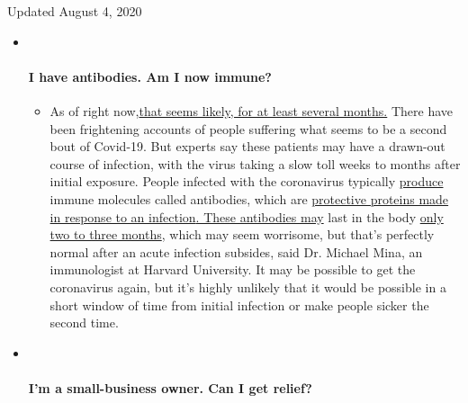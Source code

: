 Updated August 4, 2020

\begin{itemize}
\item ~
  \hypertarget{i-have-antibodies-am-i-now-immune}{%
  \paragraph{I have antibodies. Am I now
  immune?}\label{i-have-antibodies-am-i-now-immune}}

  \begin{itemize}
  \tightlist
  \item
    As of right
    now,\href{https://www.nytimes.com/2020/07/22/health/covid-antibodies-herd-immunity.html?action=click\&pgtype=Article\&state=default\&region=MAIN_CONTENT_3\&context=storylines_faq}{that
    seems likely, for at least several months.} There have been
    frightening accounts of people suffering what seems to be a second
    bout of Covid-19. But experts say these patients may have a
    drawn-out course of infection, with the virus taking a slow toll
    weeks to months after initial exposure. People infected with the
    coronavirus typically
    \href{https://www.nature.com/articles/s41586-020-2456-9}{produce}
    immune molecules called antibodies, which are
    \href{https://www.nytimes.com/2020/05/07/health/coronavirus-antibody-prevalence.html?action=click\&pgtype=Article\&state=default\&region=MAIN_CONTENT_3\&context=storylines_faq}{protective
    proteins made in response to an
    infection}\href{https://www.nytimes.com/2020/05/07/health/coronavirus-antibody-prevalence.html?action=click\&pgtype=Article\&state=default\&region=MAIN_CONTENT_3\&context=storylines_faq}{.
    These antibodies may} last in the body
    \href{https://www.nature.com/articles/s41591-020-0965-6}{only two to
    three months}, which may seem worrisome, but that's perfectly normal
    after an acute infection subsides, said Dr. Michael Mina, an
    immunologist at Harvard University. It may be possible to get the
    coronavirus again, but it's highly unlikely that it would be
    possible in a short window of time from initial infection or make
    people sicker the second time.
  \end{itemize}
\item ~
  \hypertarget{im-a-small-business-owner-can-i-get-relief}{%
  \paragraph{I'm a small-business owner. Can I get
  relief?}\label{im-a-small-business-owner-can-i-get-relief}}


\end{itemize}
